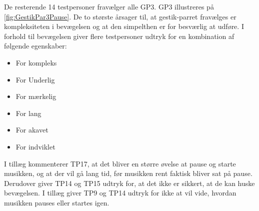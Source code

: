 \noindent
De resterende 14 testpersoner fravælger alle GP3. GP3 illustreres på \autoref{fig:GestikPar3Pause}. De to største årsager til, at gestik-parret fravælges er kompleksiteten i bevægelsen og at den simpelthen er for besværlig at udføre. I forhold til bevægelsen giver flere testpersoner udtryk for en kombination af følgende egenskaber:
%
\begin{multicols}{3}
    \begin{itemize}
        \item For kompleks
        \item For Underlig
        \item For mærkelig
        \item For lang
        \item For akavet
        \item For indviklet
\end{itemize}
\end{multicols}
\noindent
%  
I tillæg kommenterer TP17, at det bliver en større øvelse at pause og starte musikken, og at der vil gå lang tid, før musikken rent faktisk bliver sat på pause. Derudover giver TP14 og TP15 udtryk for, at det ikke er sikkert, at de kan huske bevægelsen. I tillæg giver TP9 og TP14 udtryk for ikke at vil vide, hvordan musikken pauses eller startes igen. 

